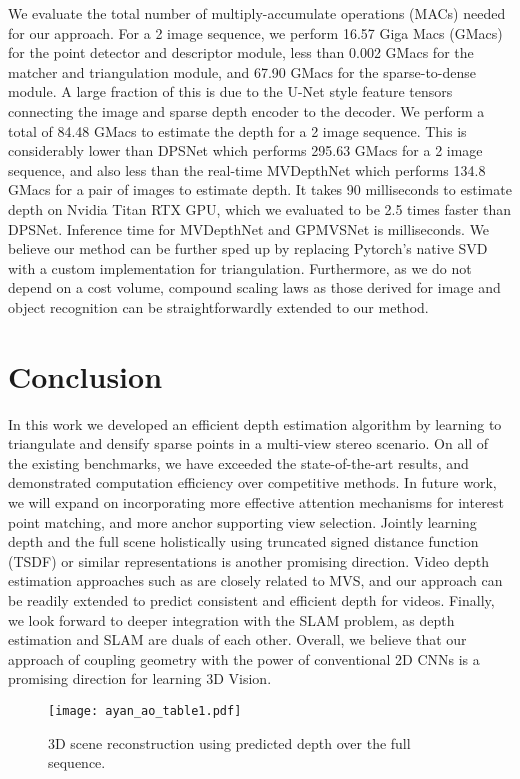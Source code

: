 \documentclass[runningheads]{llncs}
\begin{document}
We evaluate the total number of multiply-accumulate operations (MACs) needed for our approach. For a 2 image sequence, we perform 16.57 Giga Macs (GMacs) for the point detector and descriptor module, less than 0.002 GMacs for the matcher and triangulation module, and 67.90 GMacs for the sparse-to-dense module. A large fraction of this is due to the U-Net style feature tensors connecting the image and sparse depth encoder to the decoder. We perform a total of 84.48 GMacs to estimate the depth for a 2 image sequence. This is considerably lower than DPSNet which performs 295.63 GMacs for a 2 image sequence, and also less than the real-time MVDepthNet which performs 134.8 GMacs for a pair of images to estimate depth. It takes 90 milliseconds to estimate depth on Nvidia Titan RTX GPU, which we evaluated to be 2.5 times faster than DPSNet. Inference time for MVDepthNet and GPMVSNet is  milliseconds. We believe our method can be further sped up by replacing Pytorch's native SVD with a custom  implementation for triangulation. Furthermore, as we do not depend on a cost volume, compound scaling laws as those derived for image \cite{tan2019efficientnet} and object \cite{tan2019efficientdet} recognition can be straightforwardly extended to our method. 





\section{Conclusion}
In this work we developed an efficient depth estimation algorithm by learning to triangulate and densify sparse points in a multi-view stereo scenario. On all of the existing benchmarks, we have exceeded the state-of-the-art results, and demonstrated computation efficiency over competitive methods. In future work, we will expand on incorporating more effective attention mechanisms for interest point matching, and more anchor supporting view selection. Jointly learning depth and the full scene holistically using truncated signed distance function (TSDF) or similar representations is another promising direction. Video depth estimation approaches such as \cite{Luo-VideoDepth-2020} are closely related to MVS, and our approach can be readily extended to predict consistent and efficient depth for videos. Finally, we look forward to deeper integration with the SLAM problem, as depth estimation and SLAM are duals of each other. Overall, we believe that our approach of coupling geometry with the power of conventional 2D CNNs is a promising direction for learning 3D Vision. 
\begin{figure}
\centering
\texttt{[image: ayan\_ao\_table1.pdf]}
\caption{3D scene reconstruction using predicted depth over the full sequence.} 
\label{geo}
\end{figure}
\end{document}
